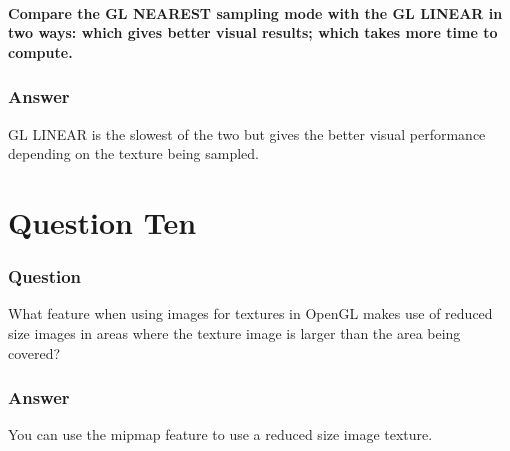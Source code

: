 \documentclass{report}
\begin{document}
\subsection{ Compare the GL NEAREST sampling mode with the GL LINEAR in two ways: which gives better visual results; which takes more time to compute.}
\section{Answer}
GL LINEAR is the slowest of the two but gives the better visual performance depending on the texture being sampled.
\part{Question Ten}
\section{Question}
What feature when using images for textures in OpenGL makes use of reduced size images in areas where the texture image is larger than the area being covered?
\section{Answer}
You can use the mipmap feature to use a reduced size image texture.
\end{document}
